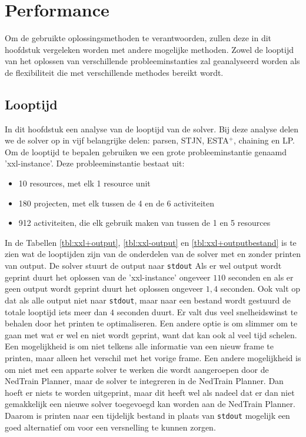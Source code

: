 \section{Performance}
Om de gebruikte oplossingsmethoden te verantwoorden, zullen deze in dit hoofdstuk vergeleken worden met andere mogelijke methoden. Zowel de looptijd van het oplossen van verschillende probleeminstanties zal geanalyseerd worden als de flexibiliteit die met verschillende methodes bereikt wordt.

\subsection{Looptijd}
In dit hoofdstuk een analyse van de looptijd van de solver. Bij deze analyse delen we de solver op in vijf belangrijke delen: parsen, STJN, ESTA$^+$, chaining en LP. Om de looptijd te bepalen gebruiken we een grote probleeminstantie genaamd 'xxl-instance'. Deze probleeminstantie bestaat uit:
\begin{itemize}
    \item 10 resources, met elk 1 resource unit
    \item 180 projecten, met elk tussen de 4 en de 6 activiteiten
    \item 912 activiteiten, die elk gebruik maken van tussen de 1 en 5 resources
\end{itemize}

In de Tabellen \ref{tbl:xxl+output}, \ref{tbl:xxl-output} en \ref{tbl:xxl+outputbestand} is te zien wat de looptijden zijn van de onderdelen van de solver met en zonder printen van output. De solver stuurt de output naar \texttt{stdout} Als er wel output wordt geprint duurt het oplossen van de 'xxl-instance' ongeveer $110$ seconden en als er geen output wordt geprint duurt het oplossen ongeveer $1,4$ seconden. Ook valt op dat als alle output niet naar \texttt{stdout}, maar naar een bestand wordt gestuurd de totale looptijd iets meer dan $4$ seconden duurt. Er valt dus veel snelheidswinst te behalen door het printen te optimaliseren. Een andere optie is om slimmer om te gaan met wat er wel en niet wordt geprint, want dat kan ook al veel tijd schelen. Een mogelijkheid is om niet telkens alle informatie van een nieuw frame te printen, maar alleen het verschil met het vorige frame. Een andere mogelijkheid is om niet met een apparte solver te werken die wordt aangeroepen door de NedTrain Planner, maar de solver te integreren in de NedTrain Planner. Dan hoeft er niets te worden uitgeprint, maar dit heeft wel als nadeel dat er dan niet gemakkelijk een nieuwe solver toegevoegd kan worden aan de NedTrain Planner. Daarom is printen naar een tijdelijk bestand in plaats van \texttt{stdout} mogelijk een goed alternatief om voor een versnelling te kunnen zorgen. 

